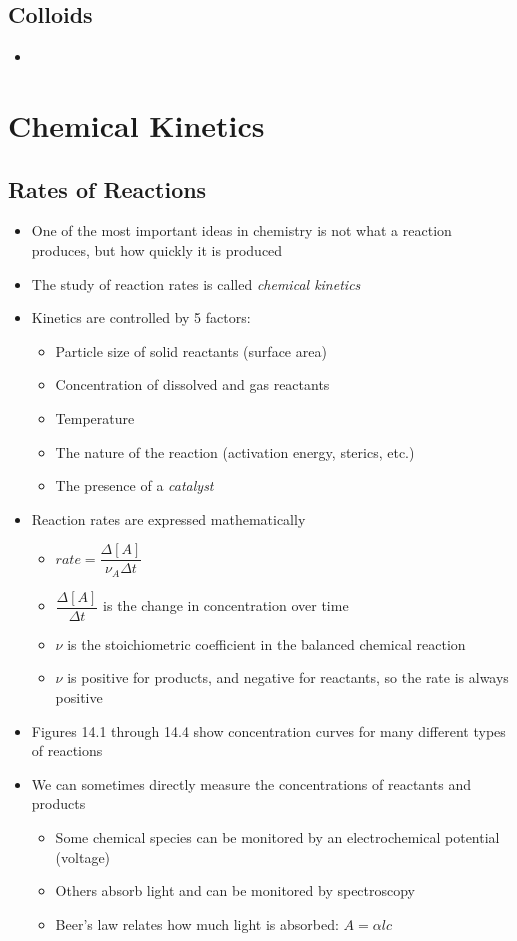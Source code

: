 \documentclass[12pt, openany, letterpaper]{memoir}
\begin{document}
\section{Colloids}
\begin{itemize}
  \item ~
\end{itemize}

\chapter{Chemical Kinetics}
\section{Rates of Reactions}
\begin{itemize}
	\item One of the most important ideas in chemistry is not what a reaction produces, but how quickly it is produced
	\item The study of reaction rates is called \emph{chemical kinetics}
	\item Kinetics are controlled by 5 factors:
	\begin{itemize}
		\item Particle size of solid reactants (surface area)
		\item Concentration of dissolved and gas reactants
		\item Temperature
		\item The nature of the reaction (activation energy, sterics, etc.)
		\item The presence of a \emph{catalyst}
	\end{itemize}
	\item Reaction rates are expressed mathematically
	\begin{itemize}
		\item $rate=\dfrac{\Delta\left[A\right]}{\nu_A\Delta t}$
		\item $\dfrac{\Delta\left[A\right]}{\Delta t}$ is the change in concentration over time
		\item $\nu$ is the stoichiometric coefficient in the balanced chemical reaction
		\item $\nu$ is positive for products, and negative for reactants, so the rate is always positive
	\end{itemize}
	\item Figures 14.1 through 14.4 show concentration curves for many different types of reactions
	\item We can sometimes directly measure the concentrations of reactants and products
	\begin{itemize}
		\item Some chemical species can be monitored by an electrochemical potential (voltage)
		\item Others absorb light and can be monitored by spectroscopy
		\item Beer's law relates how much light is absorbed: $A=\alpha lc$
	\end{itemize}
\end{itemize}
\end{document}
